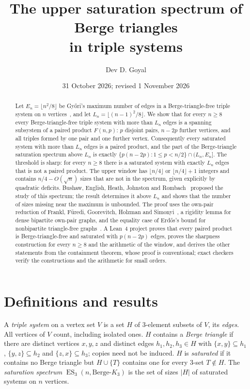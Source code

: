 \documentclass[11pt]{article}
\title{\textbf{The upper saturation spectrum of Berge triangles\\in triple systems}}
\author{Dev D. Goyal}
\date{31 October 2026; revised 1 November 2026}
\theoremstyle{remark}
\newcommand{\F}{F}
\begin{document}
\maketitle
\begin{abstract}
Let $E_n=\lfloor n^2/8\rfloor$ be Gy\H{o}ri's maximum number of edges in a
Berge-triangle-free triple system on $n$ vertices~\cite{Gyori}, and let
$L_n=\lfloor (n-1)^2/8\rfloor$. We show that for every $n\ge 8$ every
Berge-triangle-free triple system with more than $L_n$ edges is a spanning
subsystem of a paired product $\F(n,p)$: $p$ disjoint pairs, $n-2p$ further
vertices, and all triples formed by one pair and one further vertex.
Consequently every saturated system with more than $L_n$ edges is a paired
product, and the part of the Berge-triangle saturation spectrum above $L_n$
is exactly $\{p(n-2p):1\le p<n/2\}\cap(L_n,E_n]$. The threshold is sharp:
for every $n\ge 8$ there is a saturated system with exactly $L_n$ edges that
is not a paired product. The upper window has $\lfloor n/4\rfloor$ or
$\lfloor n/4\rfloor+1$ integers and contains $n/4-O(\sqrt n)$ sizes that are
not in the spectrum, given explicitly by quadratic deficits. Bushaw,
English, Heath, Johnston and Rombach~\cite{BEHJR} proposed the study of this
spectrum; the result determines it above $L_n$ and shows that the number
of sizes missing near the maximum is unbounded. The proof uses
the own-pair reduction of Frankl, F\"uredi, Goorevitch, Holzman and
Simonyi~\cite{FFGHS}, a rigidity lemma for dense bipartite own-pair graphs,
and the equality case of Erd\H{o}s's bound for nonbipartite triangle-free
graphs~\cite{Erdos}.
A Lean~4 project proves that every paired product is Berge-triangle-free
and saturated with $p(n-2p)$ edges, proves the sharpness construction for
every $n\ge8$ and the arithmetic of the window, and derives the other
statements from the containment theorem, whose proof is conventional; exact
checkers verify the constructions and the arithmetic for small orders.
\end{abstract}

\section{Definitions and results}

A \emph{triple system} on a vertex set $V$ is a set $H$ of $3$-element
subsets of $V$, its \emph{edges}. All vertices of $V$ count, including
isolated ones. $H$ contains a \emph{Berge triangle} if there are distinct
vertices $x,y,z$ and distinct edges $h_1,h_2,h_3\in H$ with
$\{x,y\}\subseteq h_1$, $\{y,z\}\subseteq h_2$ and $\{z,x\}\subseteq h_3$;
copies need not be induced. $H$ is \emph{saturated} if it contains no
Berge triangle but $H\cup\{T\}$ contains one for every $3$-set $T\notin H$.
The \emph{saturation spectrum} $\operatorname{ES}_3(n,\text{Berge-}K_3)$ is
the set of sizes $|H|$ of saturated systems on $n$ vertices.
\end{document}
